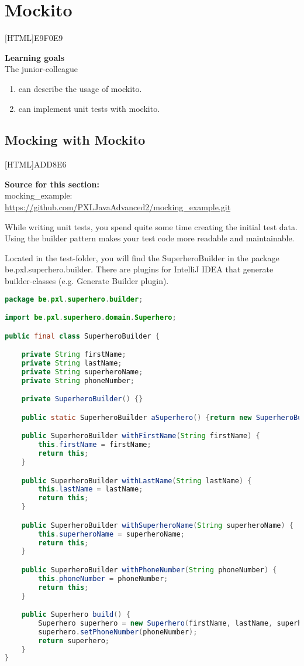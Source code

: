 \chapter{Mockito}

[HTML]{E9F0E9}{\parbox{\textwidth}{%
\noindent \textbf{Learning goals}\\
The junior-colleague
\begin{enumerate}[nolistsep]
\item can describe the usage of mockito.
\item can implement unit tests with mockito.
\end{enumerate}}}

\section{Mocking with Mockito}

[HTML]{ADD8E6}{\parbox{\textwidth}{%
\noindent \textbf{Source for this section:}\\
mocking\_example: \url{https://github.com/PXLJavaAdvanced2/mocking_example.git}
}}

While writing unit tests,  you spend quite some time creating the initial test data. Using the builder pattern makes your test code more readable and maintainable.

Located in the test-folder, you will find the SuperheroBuilder in the package be.pxl.superhero.builder.
There are plugins for IntelliJ IDEA that generate builder-classes (e.g.  Generate Builder plugin).

\begin{lstlisting}[frame=single,language=java]
package be.pxl.superhero.builder;

import be.pxl.superhero.domain.Superhero;

public final class SuperheroBuilder {

	private String firstName;
	private String lastName;
	private String superheroName;
	private String phoneNumber;

	private SuperheroBuilder() {}

	public static SuperheroBuilder aSuperhero() {return new SuperheroBuilder();}

	public SuperheroBuilder withFirstName(String firstName) {
		this.firstName = firstName;
		return this;
	}

	public SuperheroBuilder withLastName(String lastName) {
		this.lastName = lastName;
		return this;
	}

	public SuperheroBuilder withSuperheroName(String superheroName) {
		this.superheroName = superheroName;
		return this;
	}

	public SuperheroBuilder withPhoneNumber(String phoneNumber) {
		this.phoneNumber = phoneNumber;
		return this;
	}

	public Superhero build() {
		Superhero superhero = new Superhero(firstName, lastName, superheroName);
		superhero.setPhoneNumber(phoneNumber);
		return superhero;
	}
}
\end{lstlisting}

